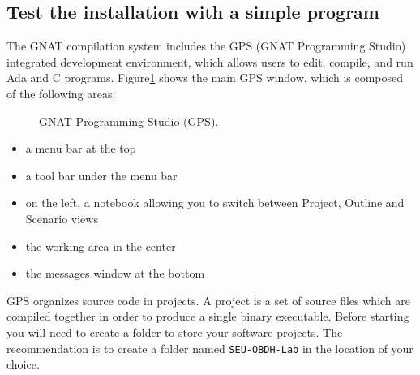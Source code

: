 \subsection{Test the installation with a simple program}

The GNAT compilation system includes the
GPS (GNAT Programming Studio) integrated development environment,
which allows users to edit, compile, and run Ada and C programs. Figure\ref{fig:gps} shows the main GPS window,
which is composed of the following areas:

\begin{figure}[hbtp!]
    \caption{GNAT Programming Studio (GPS).}
    \label{fig:gps}
\end{figure}

\begin{itemize}
\item	a menu bar at the top
\item	a tool bar under the menu bar
\item	on the left, a notebook allowing you to switch between Project, Outline and Scenario views
\item	the working area in the center
\item	the messages window at the bottom
\end{itemize}

GPS organizes source code in projects.
A project is a set of source files which are compiled together
in order to produce a single binary executable.
Before starting you will need to create a folder to store your software projects.
The recommendation is to create a folder named
\textcolor{mPurple}{\texttt{SEU-OBDH-Lab}}
in the location of your choice.


